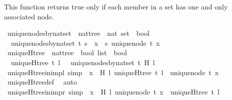 \begin{isabellebody}
\begin{isamarkuptext}%
This function returns true only if each member in a set has one and only associated node.%
\end{isamarkuptext}\isamarkuptrue%
\isamarkupfalse%
\ unique{\isacharunderscore}nodes{\isacharunderscore}by{\isacharunderscore}nat{\isacharunderscore}set\ {\isacharcolon}{\isacharcolon}\ {\isachardoublequoteopen}nattree\ {\isasymRightarrow}\ nat\ set\ {\isasymRightarrow}\ bool{\isachardoublequoteclose}\ \isanewline
\ \ {\isachardoublequoteopen}unique{\isacharunderscore}nodes{\isacharunderscore}by{\isacharunderscore}nat{\isacharunderscore}set\ t\ s\ {\isacharequal}\ {\isacharparenleft}{\isasymforall}x\ {\isasymin}\ s{\isachardot}\ unique{\isacharunderscore}node\ t\ x{\isacharparenright}{\isachardoublequoteclose}\isanewline
\ \ \isanewline
{}\isamarkupfalse%
\ uniqueH{\isacharunderscore}tree\ {\isacharcolon}{\isacharcolon}\ {\isachardoublequoteopen}nattree\ {\isasymRightarrow}\ bool\ list\ {\isasymRightarrow}\ bool{\isachardoublequoteclose}\ \isanewline
\ \ {\isachardoublequoteopen}uniqueH{\isacharunderscore}tree\ t\ l\ {\isacharequal}\ \ unique{\isacharunderscore}nodes{\isacharunderscore}by{\isacharunderscore}nat{\isacharunderscore}set\ t\ {\isacharparenleft}H\ l{\isacharparenright}{\isachardoublequoteclose}\ \ \ \ \isanewline
\isanewline
{}\isamarkupfalse%
\ uniqueH{\isacharunderscore}tree{\isacharunderscore}in{\isacharunderscore}imp{\isacharunderscore}l\ {\isacharbrackleft}simp{\isacharbrackright}{\isacharcolon}\ {\isachardoublequoteopen}{\isasymforall}\ x\ {\isasymin}\ H\ l{\isachardot}\ uniqueH{\isacharunderscore}tree\ t\ l\ {\isasymlongrightarrow}\ unique{\isacharunderscore}node\ t\ x{\isachardoublequoteclose}\isanewline
%
\isadelimproof
\ \ %
\endisadelimproof
%
\isatagproof
{}\isamarkupfalse%
\ uniqueH{\isacharunderscore}tree{\isacharunderscore}def\ \isamarkupfalse%
\ auto%
\endisatagproof
{\isafoldproof}%
%
\isadelimproof
\ \isanewline
%
\endisadelimproof
\ \ \ \ \isanewline
{}\isamarkupfalse%
\ uniqueH{\isacharunderscore}tree{\isacharunderscore}in{\isacharunderscore}imp{\isacharunderscore}r\ {\isacharbrackleft}simp{\isacharbrackright}{\isacharcolon}\ {\isachardoublequoteopen}{\isacharparenleft}{\isasymforall}\ x\ {\isasymin}\ H\ l{\isachardot}\ unique{\isacharunderscore}node\ t\ x{\isacharparenright}\ {\isasymlongrightarrow}\ uniqueH{\isacharunderscore}tree\ t\ l{\isachardoublequoteclose}\isanewline
%
\isadelimproof
\ \ %

\end{isabellebody}
